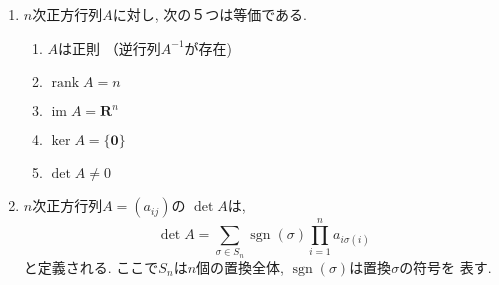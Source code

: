 \documentclass[a4paper,12pt]{jarticle}
\DeclareMathOperator{\rank}{rank}
\DeclareMathOperator{\im}{im}
\DeclareMathOperator{\sgn}{sgn}
\begin{document}
\begin{enumerate}

\item $n$次正方行列$A$に対し, 次の５つは等価である.
\begin{enumerate}

\item $A$は正則 （逆行列$A^{-1}$が存在)

\item  $\rank A = n$

\item $\im A = \mathbf{R}^n$

\item $\ker A = \{ \bm{0} \}$

\item $\det A \neq 0$

\end{enumerate}

\item $n$次正方行列$A = (a_{ij})$の $\det A$は,
\[\det A = \sum_{\sigma \in S_n} \sgn(\sigma) \prod_{i=1}^{n}a_{i \sigma (i)} \]
と定義される. ここで$S_n$は$n$個の置換全体, $\sgn(\sigma)$は置換$\sigma$の符号を
表す.

\end{enumerate}
\end{document}
